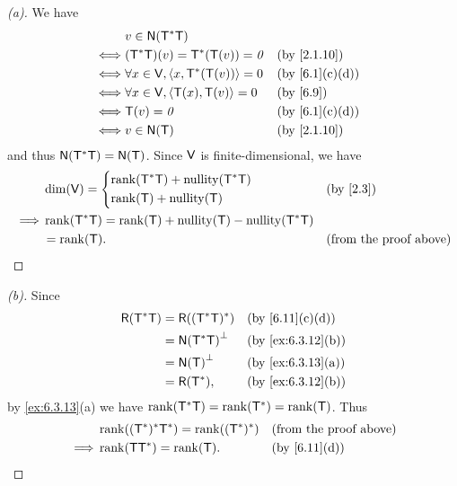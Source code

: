 \begin{proof}[(a)]
  We have
  \begin{align*}
         & v \in \ns{\T^* \T}                                                           \\
    \iff & (\T^* \T)(v) = \T^*(\T(v)) = \zv           &  & \text{(by \cref{2.1.10})}    \\
    \iff & \forall x \in \V, \inn{x, \T^*(\T(v))} = 0 &  & \text{(by \cref{6.1}(c)(d))} \\
    \iff & \forall x \in \V, \inn{\T(x), \T(v)} = 0   &  & \text{(by \cref{6.9})}       \\
    \iff & \T(v) = \zv                                &  & \text{(by \cref{6.1}(c)(d))} \\
    \iff & v \in \ns{\T}                              &  & \text{(by \cref{2.1.10})}
  \end{align*}
  and thus \(\ns{\T^* \T} = \ns{\T}\).
  Since \(\mathsf{V}\) is finite-dimensional, we have
  \begin{align*}
             & \dim(\V) = \begin{dcases}
                            \rk{\T^* \T} + \nt{\T^* \T} \\
                            \rk{\T} + \nt{\T}
                          \end{dcases}                  &  & \text{(by \cref{2.3})}               \\
    \implies & \rk{\T^* \T} = \rk{\T} + \nt{\T} - \nt{\T^* \T}                                    \\
             & = \rk{\T}.                                      &  & \text{(from the proof above)}
  \end{align*}
\end{proof}

\begin{proof}[(b)]
  Since
  \begin{align*}
    \rg{\T^* \T} & = \rg{(\T^* \T)^*}     &  & \text{(by \cref{6.11}(c)(d))}   \\
                 & = \ns{\T^* \T}^{\perp} &  & \text{(by \cref{ex:6.3.12}(b))} \\
                 & = \ns{\T}^{\perp}      &  & \text{(by \cref{ex:6.3.13}(a))} \\
                 & = \rg{\T^*},           &  & \text{(by \cref{ex:6.3.12}(b))}
  \end{align*}
  by \cref{ex:6.3.13}(a) we have \(\rk{\T^* \T} = \rk{\T^*} = \rk{\T}\).
  Thus
  \begin{align*}
             & \rk{(\T^*)^* \T^*} = \rk{(\T^*)^*} &  & \text{(from the proof above)} \\
    \implies & \rk{\T \T^*} = \rk{\T}.            &  & \text{(by \cref{6.11}(d))}
  \end{align*}
\end{proof}

